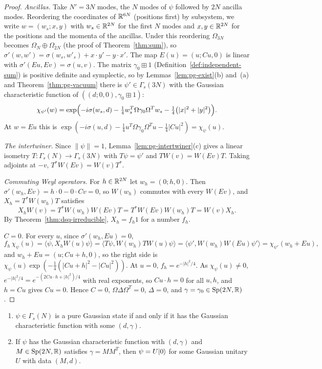 \begin{veteenv}
\begin{proof}
\emph{Ancillas.} Take $N'=3N$ modes, the $N$ modes of $\psi$ followed by $2N$ ancilla modes. Reordering the coordinates of $\mathbb R^{6N}$
(positions first) by subsystem, we write $w=(w_s;x,y)$ with $w_s\in\mathbb R^{2N}$ for the first $N$ modes and $x,y\in\mathbb R^{2N}$ for the positions
and the momenta of the ancillas. Under this reordering $\Omega_{3N}$ becomes $\Omega_N\oplus\Omega_{2N}$ (the proof of
Theorem~\ref{thm:sum}), so $\sigma'(w,w')=\sigma(w_s,w'_s)+x\cdot y'-y\cdot x'$. The map $E(u)=(u;Cu,0)$ is linear with
$\sigma'(Eu,Ev)=\sigma(u,v)$. The matrix $\gamma_0\boxplus1$ (Definition~\ref{def:independent-sum}) is positive definite and symplectic, so by
Lemmas~\ref{lem:pg-exist}(b) and~(a) and Theorem~\ref{thm:pg-vacuum} there is $\psi'\in\Gamma_s(3N)$ with the Gaussian characteristic
function of $((d;0,0),\gamma_0\boxplus1)$:
\[
 \chi_{\psi'}(w)=\exp\Bigl(-i\sigma(w_s,d)-\tfrac14w_s^T\Omega\gamma_0\Omega^Tw_s-\tfrac14\bigl(\lvert x\rvert^2+\lvert y\rvert^2\bigr)\Bigr).
\]
At $w=Eu$ this is $\exp(-i\sigma(u,d)-\frac14u^T\Omega\gamma_0\Omega^Tu-\frac14\lvert Cu\rvert^2)=\chi_\psi(u)$.

\emph{The intertwiner.} Since $\lVert\psi\rVert=1$, Lemma~\ref{lem:pg-intertwiner}(c) gives a linear isometry $T:\Gamma_s(N)\to\Gamma_s(3N)$
with $T\psi=\psi'$ and $TW(v)=W(Ev)T$. Taking adjoints at $-v$, $T^*W(Ev)=W(v)T^*$.

\emph{Commuting Weyl operators.} For $h\in\mathbb R^{2N}$ let $w_h=(0;h,0)$. Then $\sigma'(w_h,Ev)=h\cdot0-0\cdot Cv=0$, so $W(w_h)$ commutes with
every $W(Ev)$, and $X_h=T^*W(w_h)T$ satisfies
\[
 X_hW(v)=T^*W(w_h)W(Ev)T=T^*W(Ev)W(w_h)T=W(v)X_h .
\]
By Theorem~\ref{thm:dsq-irreducible}, $X_h=f_h1$ for a number $f_h$.

\emph{$C=0$.} For every $u$, since $\sigma'(w_h,Eu)=0$,
\[
 f_h\,\chi_\psi(u)=\langle\psi,X_hW(u)\psi\rangle=\langle T\psi,W(w_h)TW(u)\psi\rangle=\langle\psi',W(w_h)W(Eu)\psi'\rangle=\chi_{\psi'}(w_h+Eu),
\]
and $w_h+Eu=(u;Cu+h,0)$, so the right side is $\chi_\psi(u)\exp(-\frac14(\lvert Cu+h\rvert^2-\lvert Cu\rvert^2))$. At $u=0$,
$f_h=e^{-\lvert h\rvert^2/4}$. As $\chi_\psi(u)\ne0$, $e^{-\lvert h\rvert^2/4}=e^{-(2Cu\cdot h+\lvert h\rvert^2)/4}$ with real exponents, so
$Cu\cdot h=0$ for all $u,h$, and $h=Cu$ gives $Cu=0$. Hence $C=0$, $\Omega\Delta\Omega^T=0$, $\Delta=0$, and $\gamma=\gamma_0\in\mathrm{Sp}(2N,\mathbb R)$.
\end{proof}

\begin{theorem}\label{thm:pg-equiv}
\begin{enumerate}
\item[(a)] $\psi\in\Gamma_s(N)$ is a pure Gaussian state if and only if it has the Gaussian characteristic function with some $(d,\gamma)$.
\item[(b)] If $\psi$ has the Gaussian characteristic function with $(d,\gamma)$ and $M\in\mathrm{Sp}(2N,\mathbb R)$ satisfies $\gamma=MM^T$, then $\psi=U\lvert 0\rangle$ for
some Gaussian unitary $U$ with data $(M,d)$.
\end{enumerate}
\end{theorem}


\end{veteenv}
